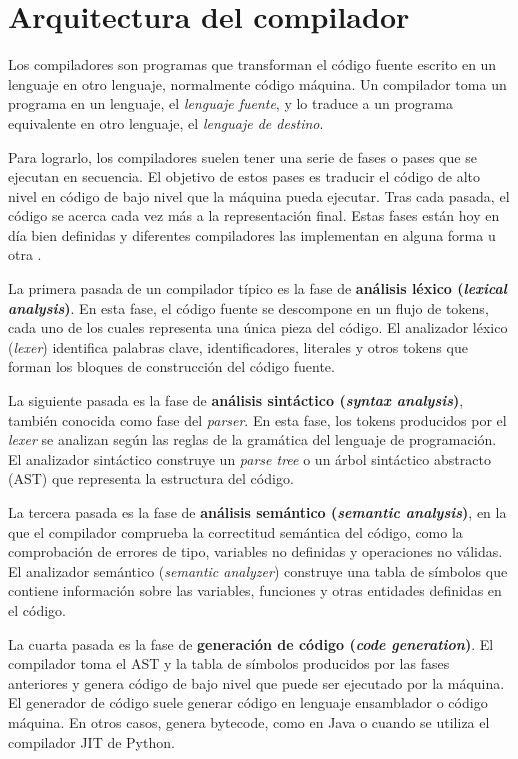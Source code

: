 \section{Arquitectura del compilador}
\label{sec:compiler-architecture}

Los compiladores son programas que transforman el código fuente escrito en un lenguaje en
otro lenguaje, normalmente código máquina. Un compilador toma un programa en un lenguaje,
el \emph{lenguaje fuente}, y lo traduce a un programa equivalente en otro lenguaje, el \emph{lenguaje de
destino}.

Para lograrlo, los compiladores suelen tener una serie de fases o pases que se ejecutan en
secuencia. El objetivo de estos pases es traducir el código de alto nivel en código de bajo nivel
que la máquina pueda ejecutar. Tras cada pasada, el código se acerca cada vez más a la
representación final. Estas fases están hoy en día bien definidas y diferentes compiladores las
implementan en alguna forma u otra \cite[Chap. 1.2]{aho2014compilers}.

La primera pasada de un compilador típico es la fase de \textbf{análisis léxico (\textit{lexical analysis})}.
En esta fase, el código fuente se descompone en un flujo de tokens, cada uno de los cuales representa una única pieza
del código. El analizador léxico (\emph{lexer}) identifica palabras clave, identificadores, literales y otros
tokens que forman los bloques de construcción del código fuente.

La siguiente pasada es la fase de \textbf{análisis sintáctico (\textit{syntax analysis})}, también conocida como fase del
\textit{parser}. En esta fase, los tokens producidos por el \emph{lexer} se analizan según las
reglas de la gramática del lenguaje de programación. El analizador sintáctico construye un
\emph{parse tree} o un árbol sintáctico abstracto (\acrfull{AST}) que representa la estructura del
código.

La tercera pasada es la fase de \textbf{análisis semántico (\textit{semantic analysis})}, en la que el compilador comprueba la
correctitud semántica del código, como la comprobación de errores de tipo, variables no
definidas y operaciones no válidas. El analizador semántico (\emph{semantic analyzer}) construye una tabla de símbolos
que contiene información sobre las variables, funciones y otras entidades definidas en el
código.

La cuarta pasada es la fase de \textbf{generación de código (\textit{code generation})}. El compilador toma el \acrshort{AST} y la tabla de
símbolos producidos por las fases anteriores y genera código de bajo nivel que puede ser
ejecutado por la máquina. El generador de código suele generar código en lenguaje
ensamblador o código máquina. En otros casos, genera bytecode, como en Java o cuando se
utiliza el compilador \acrfull{JIT} de Python.

